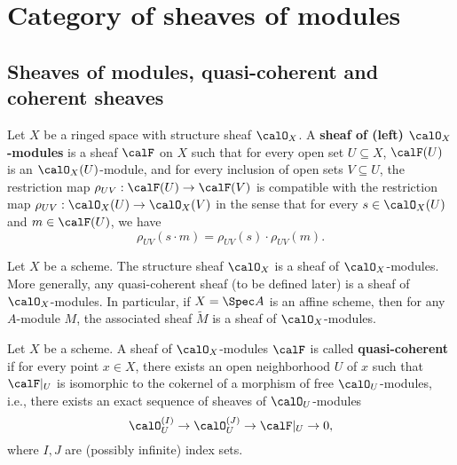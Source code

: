 \section{Category of sheaves of modules}

\subsection{Sheaves of modules, quasi-coherent and coherent sheaves}

    \begin{definition}\label{def:sheaf_of_modules}
        Let $X$ be a ringed space with structure sheaf $\calO_X$. A \textbf{sheaf of (left) $\calO_X$-modules} is a sheaf $\calF$ on $X$ such that for every open set $U\subseteq X$, $\calF(U)$ is an $\calO_X(U)$-module, and for every inclusion of open sets $V\subseteq U$, the restriction map $\rho_{UV}:\calF(U)\to \calF(V)$ is compatible with the restriction map $\rho_{UV}:\calO_X(U)\to \calO_X(V)$ in the sense that for every $s\in \calO_X(U)$ and $m\in \calF(U)$, we have
        \[
            \rho_{UV}(s\cdot m) = \rho_{UV}(s)\cdot \rho_{UV}(m).
        \]
    \end{definition}

    \begin{example}\label{eg:module_as_sheaf_of_modules_in_affine_case}
        Let $X$ be a scheme. The structure sheaf $\calO_X$ is a sheaf of $\calO_X$-modules. More generally, any quasi-coherent sheaf (to be defined later) is a sheaf of $\calO_X$-modules.
        In particular, if $X=\Spec A$ is an affine scheme, then for any $A$-module $M$, the associated sheaf $\widetilde{M}$ is a sheaf of $\calO_X$-modules.
    \end{example}

    \begin{definition}\label{def:quasi-coherent_sheaf}
        Let $X$ be a scheme. A sheaf of $\calO_X$-modules $\calF$ is called \textbf{quasi-coherent} if for every point $x\in X$, there exists an open neighborhood $U$ of $x$ such that $\calF|_U$ is isomorphic to the cokernel of a morphism of free $\calO_U$-modules, i.e., there exists an exact sequence of sheaves of $\calO_U$-modules
        \[
            \calO_U^{(I)} \to \calO_U^{(J)} \to \calF|_U \to 0,
        \]
        where $I,J$ are (possibly infinite) index sets.
    \end{definition}

